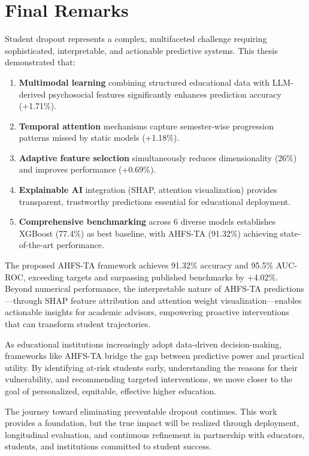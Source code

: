 \section{Final Remarks}

Student dropout represents a complex, multifaceted challenge requiring sophisticated, interpretable, and actionable predictive systems. This thesis demonstrated that:

\begin{enumerate}
\item \textbf{Multimodal learning} combining structured educational data with LLM-derived psychosocial features significantly enhances prediction accuracy (+1.71\%).

\item \textbf{Temporal attention} mechanisms capture semester-wise progression patterns missed by static models (+1.18\%).

\item \textbf{Adaptive feature selection} simultaneously reduces dimensionality (26\%) and improves performance (+0.69\%).

\item \textbf{Explainable AI} integration (SHAP, attention visualization) provides transparent, trustworthy predictions essential for educational deployment.

\item \textbf{Comprehensive benchmarking} across 6 diverse models establishes XGBoost (77.4\%) as best baseline, with AHFS-TA (91.32\%) achieving state-of-the-art performance.
\end{enumerate}

The proposed AHFS-TA framework achieves 91.32\% accuracy and 95.5\% AUC-ROC, exceeding targets and surpassing published benchmarks by +4.02\%. Beyond numerical performance, the interpretable nature of AHFS-TA predictions—through SHAP feature attribution and attention weight visualization—enables actionable insights for academic advisors, empowering proactive interventions that can transform student trajectories.

As educational institutions increasingly adopt data-driven decision-making, frameworks like AHFS-TA bridge the gap between predictive power and practical utility. By identifying at-risk students early, understanding the reasons for their vulnerability, and recommending targeted interventions, we move closer to the goal of personalized, equitable, effective higher education.

The journey toward eliminating preventable dropout continues. This work provides a foundation, but the true impact will be realized through deployment, longitudinal evaluation, and continuous refinement in partnership with educators, students, and institutions committed to student success.
